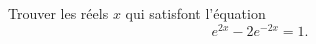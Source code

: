 
\begin{exercice}\label{exoINGE11140023}

	Trouver les réels $x$ qui satisfont l'équation
	\begin{equation}
		e^{2x}-2 e^{-2x}=1.
	\end{equation}

\end{exercice}
